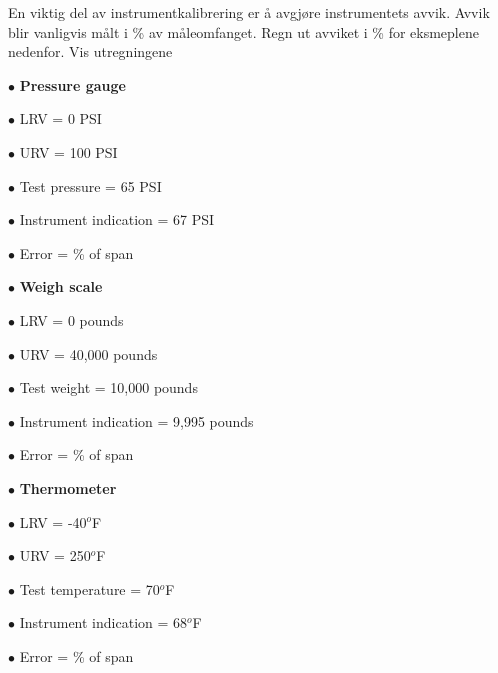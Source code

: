


En viktig del av instrumentkalibrering er {\aa} avgj{\o}re instrumentets avvik. Avvik blir vanligvis m{\aa}lt i \% av m{\aa}leomfanget. Regn ut avviket i \% for eksmeplene nedenfor. 
\medskip
Vis utregningene

\medskip
\item{$\bullet$} {\bf Pressure gauge}
\item{$\bullet$} LRV = 0 PSI
\item{$\bullet$} URV = 100 PSI 
\item{$\bullet$} Test pressure = 65 PSI 
\item{$\bullet$} Instrument indication = 67 PSI
\item{$\bullet$} Error = \underbar{\hskip 50pt} \% of span
\medskip

\vskip 10pt

\medskip
\item{$\bullet$} {\bf Weigh scale}
\item{$\bullet$} LRV = 0 pounds
\item{$\bullet$} URV = 40,000 pounds
\item{$\bullet$} Test weight = 10,000 pounds
\item{$\bullet$} Instrument indication = 9,995 pounds
\item{$\bullet$} Error = \underbar{\hskip 50pt} \% of span
\medskip

\vskip 10pt

\medskip
\item{$\bullet$} {\bf Thermometer}
\item{$\bullet$} LRV = -40$^{o}$F
\item{$\bullet$} URV = 250$^{o}$F
\item{$\bullet$} Test temperature = 70$^{o}$F
\item{$\bullet$} Instrument indication = 68$^{o}$F
\item{$\bullet$} Error = \underbar{\hskip 50pt} \% of span
\medskip

